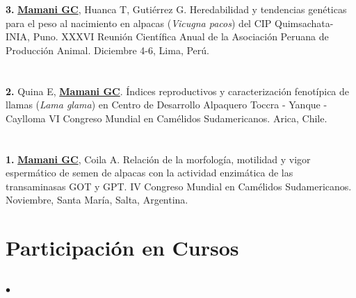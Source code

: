 \documentclass[margin,line,10pt]{res}
\newenvironment{list1}{
  \begin{list}{\ding{113}}{%
      \setlength{\itemsep}{0in}
      \setlength{\parsep}{0in} \setlength{\parskip}{0in}
      \setlength{\topsep}{0in} \setlength{\partopsep}{0in} 
      \setlength{\leftmargin}{0.17in}}}{\end{list}}
\newenvironment{list2}{
  \begin{list}{$\bullet$}{%
      \setlength{\itemsep}{0in}
      \setlength{\parsep}{0in} \setlength{\parskip}{0in}
      \setlength{\topsep}{0in} \setlength{\partopsep}{0in} 
      \setlength{\leftmargin}{0.2in}}}{\end{list}}
\begin{document}
\begin{resume}
\begin{list1}
\item [\bf{3}.] {\bf \underline{Mamani GC}}, Huanca T, Gutiérrez G.
Heredabilidad y tendencias genéticas para el peso al nacimiento en alpacas (\textit{Vicugna pacos}) del CIP Quimsachata-INIA, Puno.
XXXVI Reunión Científica Anual de la Asociación Peruana de Producción Animal. Diciembre 4-6, Lima, Perú. 
\end{list1}
\vspace{0.5cm}

\section{}
\begin{list1}
\item [\bf{2}.] Quina E, {\bf \underline{Mamani GC}}.
Índices reproductivos y caracterización fenotípica de llamas (\textit{Lama glama}) en Centro de Desarrollo Alpaquero Toccra - Yanque -Caylloma
VI Congreso Mundial en Camélidos Sudamericanos. Arica, Chile. 
\end{list1}
\vspace{0.5cm}

\section{}
\begin{list1}
\item [\bf{1}.] {\bf \underline{Mamani GC}}, Coila A.
Relación de la morfología, motilidad y vigor espermático de semen de alpacas con la actividad enzimática de las transaminasas GOT y GPT.
IV Congreso Mundial en Camélidos Sudamericanos. Noviembre, Santa María, Salta, Argentina. 
\end{list1}

\vspace{0.9cm}
\section{\sc Participación en Cursos} 
\vspace{2cm}


\section{}
\begin{list2}


\end{list2}
\end{resume}
\end{document}
